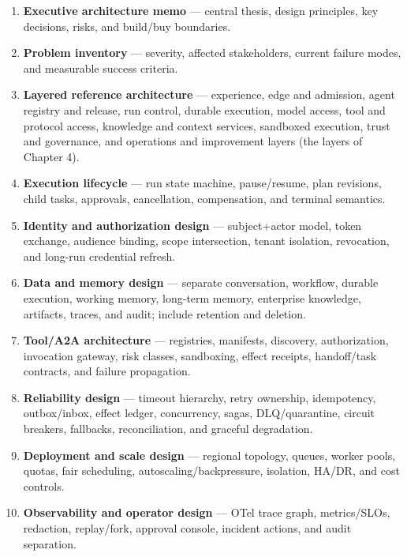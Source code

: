 \begin{enumerate}

\item \textbf{Executive architecture memo} — central thesis, design principles, key decisions, risks, and build/buy boundaries.

\item \textbf{Problem inventory} — severity, affected stakeholders, current failure modes, and measurable success criteria.

\item \textbf{Layered reference architecture} — experience, edge and admission, agent registry and release, run control, durable execution, model access, tool and protocol access, knowledge and context services, sandboxed execution, trust and governance, and operations and improvement layers (the layers of Chapter 4).

\item \textbf{Execution lifecycle} — run state machine, pause/resume, plan revisions, child tasks, approvals, cancellation, compensation, and terminal semantics.

\item \textbf{Identity and authorization design} — subject+actor model, token exchange, audience binding, scope intersection, tenant isolation, revocation, and long-run credential refresh.

\item \textbf{Data and memory design} — separate conversation, workflow, durable execution, working memory, long-term memory, enterprise knowledge, artifacts, traces, and audit; include retention and deletion.

\item \textbf{Tool/A2A architecture} — registries, manifests, discovery, authorization, invocation gateway, risk classes, sandboxing, effect receipts, handoff/task contracts, and failure propagation.

\item \textbf{Reliability design} — timeout hierarchy, retry ownership, idempotency, outbox/inbox, effect ledger, concurrency, sagas, DLQ/quarantine, circuit breakers, fallbacks, reconciliation, and graceful degradation.

\item \textbf{Deployment and scale design} — regional topology, queues, worker pools, quotas, fair scheduling, autoscaling/backpressure, isolation, HA/DR, and cost controls.

\item \textbf{Observability and operator design} — OTel trace graph, metrics/SLOs, redaction, replay/fork, approval console, incident actions, and audit separation.


\end{enumerate}
